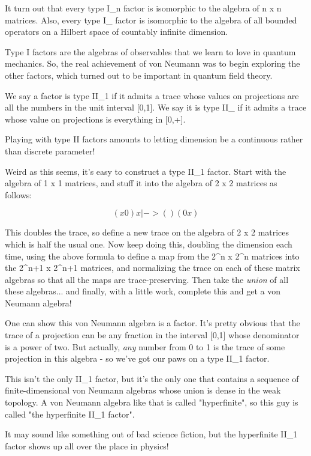 It turn out that every type I_{n} factor is isomorphic to the
algebra of n x n matrices.  Also, every type I_{\infty } factor
is isomorphic to the algebra of all bounded operators on a Hilbert space
of countably infinite dimension.

Type I factors are the algebras of observables that we learn to love in
quantum mechanics.  So, the real achievement of von Neumann was to begin
exploring the other factors, which turned out to be important in quantum
field theory.

We say a factor is type II_{1} if it admits a trace
whose values on projections are all the numbers in the unit interval
[0,1].  We say it is type II_{\infty } if it admits
a trace whose value on projections is everything in [0,+\infty ].

Playing with type II factors amounts to letting dimension be a
continuous rather than discrete parameter!  


Weird as this seems, it's easy to construct a type II_{1}
factor.  Start with the algebra of 1 x 1 matrices, and stuff it into the
algebra of 2 x 2 matrices as follows:


$$

      ( x  0 ) 
x |-> (      )
      ( 0  x )
$$
    
This doubles the trace, so define a new trace on the algebra of 2 x 2
matrices which is half the usual one.  Now keep doing this, doubling the
dimension each time, using the above formula to define a map from the
2^{n} x 2^{n} matrices into the 2^{n+1} x
2^{n+1} matrices, and normalizing the trace on each of these
matrix algebras so that all the maps are trace-preserving.  Then take
the \emph{union} of all these algebras... and finally, with a little work,
complete this and get a von Neumann algebra!

One can show this von Neumann algebra is a factor.  It's pretty
obvious that the trace of a projection can be any fraction in the
interval [0,1] whose denominator is a power of two.  But actually, 
\emph{any} number from 0 to 1 is the trace of some projection in this
algebra - so we've got our paws on a type II_{1} factor.

This isn't the only II_{1} factor, but it's the only one that
contains a sequence of finite-dimensional von Neumann algebras whose
union is dense in the weak topology.  A von Neumann algebra like that is
called "hyperfinite", so this guy is called "the
hyperfinite II_{1} factor".

It may sound like something out of bad science fiction, but the
hyperfinite II_{1} factor shows up all over the place in physics!

